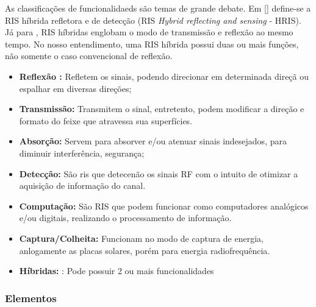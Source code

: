 \documentclass[
	12pt,				%
	openright,			%
	oneside,			%
	a4paper,			%
	english,			%
	brazil				%
	]{abntex2}
\begin{document}
As classificações de funcionalidaeds são temas de grande debate. Em [] define-se a RIS híbrida refletora e de detecção (RIS \textit{Hybrid reflecting and sensing} - HRIS). Já para \cite{CFGOBDRIS}, RIS híbridas englobam o modo de transmissão e reflexão ao mesmo tempo. No nosso entendimento, uma RIS híbrida possui duas ou mais funções, não somente o caso convencional de reflexão. 
\begin{itemize}
   
    \item \textbf{Reflexão :} Refletem os sinais, podendo direcionar em determinada direçã ou espalhar em diversas direções;

    \item \textbf{Transmissão:} Transmitem o sinal, entretento, podem modificar a direção e formato do feixe que atravessa sua superfícies.


    \item  \textbf{Absorção:} Servem para absorver e/ou atenuar sinais indesejados, para diminuir interferência, segurança;

    \item \textbf{Detecção:} São ris que detecenão os sinais RF com o intuito de otimizar a aquisição de informação do canal. 

 \item  \textbf{Computação:} São RIS que podem funcionar como computadores analógicos e/ou digitais, realizando o processamento de informação.

 \item \textbf{Captura/Colheita:} Funcionam no modo de captura de energia, anlogamente as placas solares, porém para energia radiofrequência.

 \item \textbf{Híbridas:} : Pode possuir 2 ou mais funcionalidades
\end{itemize}

\subsubsection{Elementos}   
\end{document}
